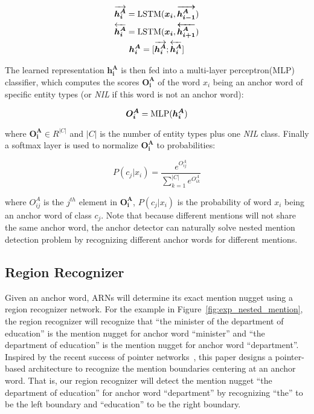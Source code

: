 \documentclass[11pt,a4paper]{article}
\begin{document}
\begin{small}
\begin{equation}
  \centering
  \begin{gathered}
    \overrightarrow{\bm{h^{A}_i}}  = {\rm LSTM} (\bm{x_i},\bm{\overrightarrow{h^{A}_{i-1}}}) \\
    \overleftarrow{\bm{h^{A}_i}}  = {\rm LSTM} (\bm{x_i},\bm{\overleftarrow{h^{A}_{i+1}}})\\
    \bm{h^{A}_i} = [\overrightarrow{\bm{h^{A}_i}}  ; \overleftarrow{\bm{h^{A}_i}}] \\
  \end{gathered}
\end{equation}
\end{small}The learned representation $\bm{h^{A}_i}$ is then fed into a multi-layer perceptron(MLP) classifier, which computes the scores $\bm{O^{A}_{i}}$ of the word $x_i$ being an anchor word of specific entity types (or \emph{NIL} if this word is not an anchor word):

\begin{small}
\begin{equation}
\bm{O^{A}_{i}}  = {\rm MLP} (\bm{h^{A}_i})
\end{equation}
\end{small}where $\bm{O^{A}_{i}} \in R^{|C|}$ and $|C|$ is the number of entity types plus one \emph{NIL} class. Finally a softmax layer is used to normalize $\bm{O^{A}_{i}}$ to probabilities:

\begin{small}
\begin{equation}
P(c_{j}|x_i) = \frac{e^{O^{A}_{ij}}}{\sum_{k=1}^{|C|} e^{O^{A}_{ik}}}
\end{equation}
\end{small}where $O^{A}_{ij}$ is the $j^{th}$ element in $\bm{O^{A}_{i}}$, $P(c_{j}|x_i)$ is the probability of word $x_i$ being an anchor word of class $c_j$.
Note that because different mentions will not share the same anchor word, the anchor detector can naturally solve nested mention detection problem by recognizing different anchor words for different mentions.

\subsection{Region Recognizer}
Given an anchor word, ARNs will determine its exact mention nugget using a region recognizer network. For the example in Figure~\ref{fig:exp_nested_mention}, the region recognizer will recognize that ``the minister of the department of education'' is the mention nugget for anchor word ``minister'' and ``the department of education'' is the mention nugget for anchor word ``department''. Inspired by the recent success of pointer networks~\cite{vinyals2015pointer,wang2016machine}, this paper designs a pointer-based architecture to recognize the mention boundaries centering at an anchor word. That is, our region recognizer will detect the mention nugget ``the department of education'' for anchor word ``department'' by recognizing ``the'' to be the left boundary and ``education'' to be the right boundary.
\end{document}

